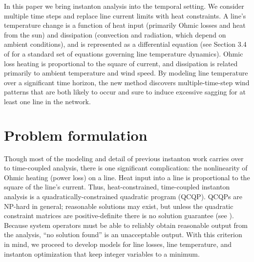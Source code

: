 \documentclass[conference]{IEEEtran}
\begin{document}
In this paper we bring instanton analysis into the temporal setting. We consider multiple time steps and replace line current limits with heat constraints. A line's temperature change is a function of heat input (primarily Ohmic losses and heat from the sun) and dissipation (convection and radiation, which depend on ambient conditions), and is represented as a differential equation (see Section 3.4 of \cite{ieee2007} for a standard set of equations governing line temperature dynamics). Ohmic loss heating is proportional to the square of current, and dissipation is related primarily to ambient temperature and wind speed. By modeling line temperature over a significant time horizon, the new method discovers multiple-time-step wind patterns that are both likely to occur and sure to induce excessive sagging for at least one line in the network.




\section{Problem formulation}

Though most of the modeling and detail of previous instanton work carries over to time-coupled analysis, there is one significant complication:  the nonlinearity of Ohmic heating (power loss) on a line. Heat input into a line is proportional to the square of the line's current. Thus, heat-constrained, time-coupled instanton analysis is a quadratically-constrained quadratic program (QCQP). QCQPs are NP-hard in general; reasonable solutions may exist, but unless the quadratic constraint matrices are positive-definite there is no solution guarantee (see \cite{mehanna2014}). Because system operators must be able to reliably obtain reasonable output from the analysis, ``no solution found'' is an unacceptable output. With this criterion in mind, we proceed to develop models for line losses, line temperature, and instanton optimization that keep integer variables to a minimum.
\end{document}
